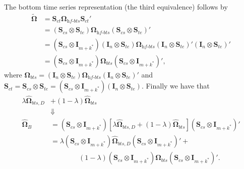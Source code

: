 \documentclass[a4paper,11pt]{article}
\newcommand{\Ivet}{\bm{I}}
\newcommand{\Svet}{\bm{S}}
\newcommand{\Omegavet}{\bm{\Omega}}
\theoremstyle{definition}
\begin{document}
The bottom time series representation (the third equivalence) follows by
\begin{align*}
	\widetilde{\Omegavet} & = \Svet_{ct}\Omegavet_{\textit{hf-bts}}\Svet_{ct}'                                                                                                                                                   \\
	          & = \left(\Svet_{cs} \otimes \Svet_{te}\right)\Omegavet_{\textit{hf-bts}}\left(\Svet_{cs} \otimes \Svet_{te}\right)'                                                                                   \\
	          & = \left(\Svet_{cs} \otimes \Ivet_{m+k^\ast}\right)\left(\Ivet_n \otimes \Svet_{te}\right)\Omegavet_{\textit{hf-bts}}\left(\Ivet_n \otimes \Svet_{te}\right)'\left(\Ivet_n \otimes \Svet_{te}\right)' \\
	          & = \left(\Svet_{cs} \otimes \Ivet_{m+k^\ast}\right)\Omegavet_{bts}\left(\Svet_{cs} \otimes \Ivet_{m+k^\ast}\right)',
\end{align*}
where $\Omegavet_{bts} = \left(\Ivet_n \otimes \Svet_{te}\right)\Omegavet_{\textit{hf-bts}}\left(\Ivet_n \otimes \Svet_{te}\right)'$ and $\Svet_{ct} = \Svet_{cs} \otimes \Svet_{te} = \left(\Svet_{cs} \otimes \Ivet_{m+k^\ast}\right)\left(\Ivet_n \otimes \Svet_{te}\right)$. Finally we have that
\begin{align*}
	\lambda \widehat{\Omegavet}_{bts, D} &+ (1-\lambda) \widehat{\Omegavet}_{bts}\\
	&\Downarrow\\
	\widehat{\Omegavet}_{B} & = \left(\Svet_{cs} \otimes \Ivet_{m+k^\ast}\right)\left[\lambda \widehat{\Omegavet}_{bts, D} + (1-\lambda) \widehat{\Omegavet}_{bts}\right]\left(\Svet_{cs} \otimes \Ivet_{m+k^\ast}\right)'                       \\
	                        & = \lambda \left(\Svet_{cs} \otimes \Ivet_{m+k^\ast}\right)\widehat{\Omegavet}_{bts, D}\left(\Svet_{cs} \otimes \Ivet_{m+k^\ast}\right)' +             \\
	                        & \qquad \qquad (1-\lambda) \left(\Svet_{cs} \otimes \Ivet_{m+k^\ast}\right)\widehat{\Omegavet}_{bts}\left(\Svet_{cs} \otimes \Ivet_{m+k^\ast}\right)'.
\end{align*}
\end{document}
